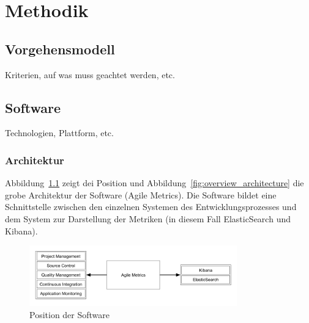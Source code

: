 \chapter{Methodik}

\section{Vorgehensmodell}

Kriterien, auf was muss geachtet werden, etc.

\section{Software}

Technologien, Plattform, etc.

\subsection{Architektur}

Abbildung~\ref{fig:position_architecture} zeigt dei Position und Abbildung~\ref{fig:overview_architecture} die grobe Architektur der Software (Agile Metrics).
Die Software bildet eine Schnittstelle zwischen den einzelnen Systemen des Entwicklungsprozesses und dem System zur Darstellung der Metriken (in diesem Fall ElasticSearch und Kibana).

\begin{savenotes}
    \begin{figure}[H] 
        \centering
            \includegraphics[width=0.8\textwidth]{img/position-overview.png}
        \caption{Position der Software}\label{fig:position_architecture}
    \end{figure}
\end{savenotes}

